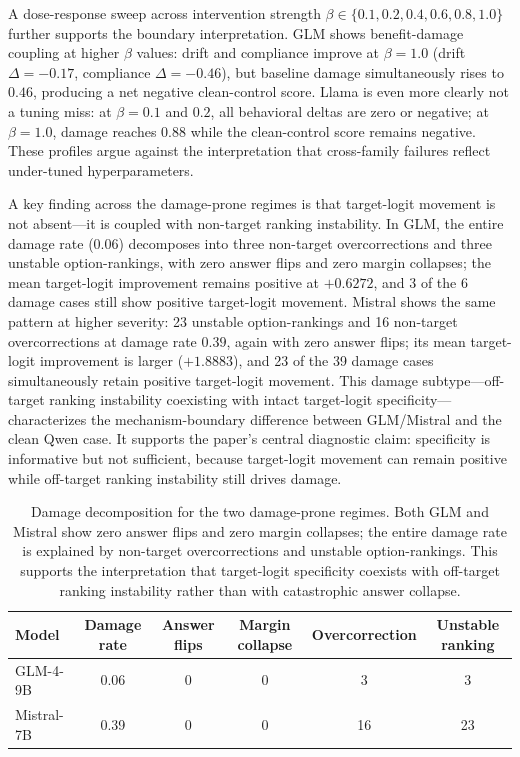 \documentclass[11pt]{article}
\begin{document}
A dose-response sweep across intervention strength \(\beta \in \{0.1, 0.2, 0.4, 0.6, 0.8, 1.0\}\) further supports the boundary interpretation.
GLM shows benefit-damage coupling at higher \(\beta\) values: drift and compliance improve at \(\beta = 1.0\) (drift \(\Delta = -0.17\), compliance \(\Delta = -0.46\)), but baseline damage simultaneously rises to \(0.46\), producing a net negative clean-control score.
Llama is even more clearly not a tuning miss: at \(\beta = 0.1\) and \(0.2\), all behavioral deltas are zero or negative; at \(\beta = 1.0\), damage reaches \(0.88\) while the clean-control score remains negative.
These profiles argue against the interpretation that cross-family failures reflect under-tuned hyperparameters.

A key finding across the damage-prone regimes is that target-logit movement is not absent---it is coupled with non-target ranking instability.
In GLM, the entire damage rate (\(0.06\)) decomposes into three non-target overcorrections and three unstable option-rankings, with zero answer flips and zero margin collapses; the mean target-logit improvement remains positive at \(+0.6272\), and 3 of the 6 damage cases still show positive target-logit movement.
Mistral shows the same pattern at higher severity: 23 unstable option-rankings and 16 non-target overcorrections at damage rate \(0.39\), again with zero answer flips; its mean target-logit improvement is larger (\(+1.8883\)), and 23 of the 39 damage cases simultaneously retain positive target-logit movement.
This damage subtype---off-target ranking instability coexisting with intact target-logit specificity---characterizes the mechanism-boundary difference between GLM/Mistral and the clean Qwen case.
It supports the paper's central diagnostic claim: specificity is informative but not sufficient, because target-logit movement can remain positive while off-target ranking instability still drives damage.

\begin{table}[t]
  \centering
  \small
  \begin{tabular}{lccccc}
    \toprule
    Model & Damage rate & Answer flips & Margin collapse & Overcorrection & Unstable ranking \\
    \midrule
    GLM-4-9B & 0.06 & 0 & 0 & 3 & 3 \\
    Mistral-7B & 0.39 & 0 & 0 & 16 & 23 \\
    \bottomrule
  \end{tabular}
  \caption{Damage decomposition for the two damage-prone regimes. Both GLM and Mistral show zero answer flips and zero margin collapses; the entire damage rate is explained by non-target overcorrections and unstable option-rankings. This supports the interpretation that target-logit specificity coexists with off-target ranking instability rather than with catastrophic answer collapse.}
  \label{tab:damage-decomposition}
\end{table}
\end{document}
